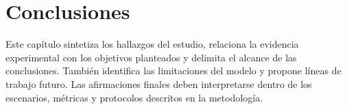 \chapter{Conclusiones}
\label{conclusiones}
Este capítulo sintetiza los hallazgos del estudio, relaciona la evidencia experimental con los objetivos planteados y delimita el alcance de las conclusiones. También identifica las limitaciones del modelo y propone líneas de trabajo futuro. Las afirmaciones finales deben interpretarse dentro de los escenarios, métricas y protocolos descritos en la metodología.
